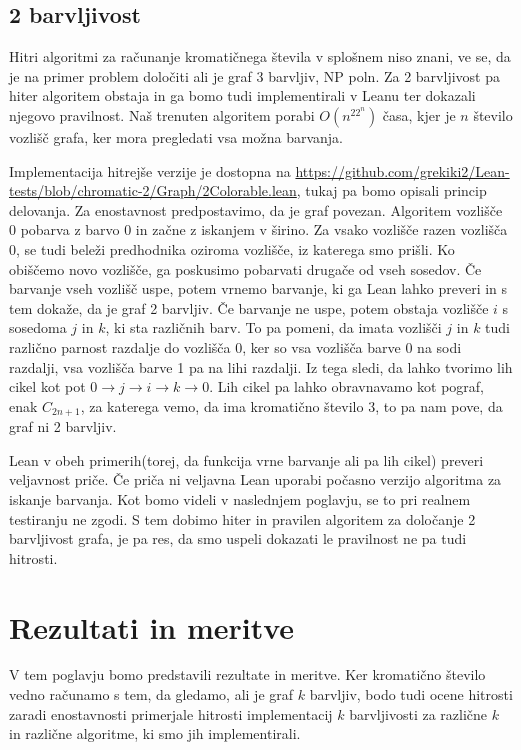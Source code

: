 \documentclass[mat1]{fmfdelo}
\begin{document}
\subsection{2 barvljivost}
Hitri algoritmi za računanje kromatičnega števila v splošnem niso znani, 
ve se, da je na primer problem določiti ali je graf 3 barvljiv, NP poln.
Za 2 barvljivost pa hiter algoritem obstaja in ga bomo tudi implementirali v Leanu ter dokazali njegovo pravilnost. 
Naš trenuten algoritem porabi $O(n^22^n)$ časa, kjer je $n$ število vozlišč grafa, ker mora pregledati vsa možna barvanja.

Implementacija hitrejše verzije je dostopna na \url{https://github.com/grekiki2/Lean-tests/blob/chromatic-2/Graph/2Colorable.lean}, tukaj pa
bomo opisali princip delovanja. 
Za enostavnost predpostavimo, da je graf povezan.
Algoritem vozlišče $0$ pobarva z barvo $0$ in začne z iskanjem v širino. Za vsako vozlišče razen vozlišča 0, se tudi beleži
predhodnika oziroma vozlišče, iz katerega smo prišli. Ko obiščemo novo vozlišče, ga poskusimo pobarvati drugače od vseh sosedov.
Če barvanje vseh vozlišč uspe, potem vrnemo barvanje, ki ga Lean lahko preveri in s tem dokaže, da je graf 2 barvljiv.
Če barvanje ne uspe, potem obstaja vozlišče $i$ s sosedoma $j$ in $k$, ki sta različnih barv. To pa pomeni, da imata vozlišči $j$ in $k$
tudi različno parnost razdalje do vozlišča $0$, ker so vsa vozlišča barve 0 na sodi razdalji, vsa vozlišča barve 1 pa na lihi razdalji.
Iz tega sledi, da lahko tvorimo lih cikel kot pot $0\to j\to i\to k\to 0$. Lih cikel pa lahko obravnavamo kot pograf, enak $C_{2n+1}$, za katerega
vemo, da ima kromatično število $3$, to pa nam pove, da graf ni 2 barvljiv.

Lean v obeh primerih(torej, da funkcija vrne barvanje ali pa lih cikel) preveri veljavnost priče. Če priča ni veljavna
Lean uporabi počasno verzijo algoritma za iskanje barvanja. Kot bomo videli v naslednjem poglavju, se to pri realnem testiranju ne zgodi. 
S tem dobimo hiter in pravilen algoritem za določanje 2 barvljivost grafa, je pa res, da smo uspeli dokazati le pravilnost
ne pa tudi hitrosti.


\section{Rezultati in meritve}
V tem poglavju bomo predstavili rezultate in meritve.
Ker kromatično število vedno računamo s tem, da gledamo, ali je graf $k$ barvljiv, bodo tudi ocene hitrosti zaradi enostavnosti
primerjale hitrosti implementacij $k$ barvljivosti za različne $k$ in različne algoritme, ki smo jih implementirali. 
\end{document}
